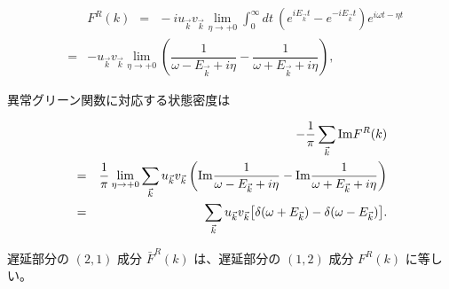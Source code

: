 \documentclass[uplatex,a4j,12pt,dvipdfmx]{jsarticle}
\begin{document}
\begin{eqnarray}
	&&
	F^{R}(k)
	\ \ = \ \
	- i
	u_{\vec{k}}
	v_{\vec{k}}
	\lim_{\eta \to +0}
	\int^{\infty}_{0} \!\! dt \
	\left(
	e^{ i E_{\vec{k}} t }
	-
	e^{ - i E_{\vec{k}} t }
	\right)
	e^{i \omega t - \eta t}
	\nonumber \\ &=&
	-
	u_{\vec{k}} v_{\vec{k}}
	\lim_{\eta \to +0}
	\left(
	\dfrac{1}{\omega - E_{\vec{k}} + i \eta }
	-
	\dfrac{1}{\omega + E_{\vec{k}} + i \eta }
	\right)
	,
\end{eqnarray}

異常グリーン関数に対応する状態密度は

\begin{eqnarray}
	&&
	-
	\dfrac{ 1 }{ \pi }
	\sum_{\vec{k}}
	{\rm Im} F^{R}(k)
	\nonumber \\ &=&
	\dfrac{ 1 }{ \pi }
	\lim_{\eta \to +0}
	\sum_{\vec{k}}
	u_{\vec{k}} v_{\vec{k}}
	\left(
	{\rm Im}
	\dfrac{1}{\omega - E_{\vec{k}} + i \eta }
	-
	{\rm Im}
	\dfrac{1}{\omega + E_{\vec{k}} + i \eta }
	\right)
	\nonumber \\ &=&
	\sum_{\vec{k}}
	u_{\vec{k}} v_{\vec{k}}
	\big[
		\delta( \omega + E_{\vec{k}} )
		-
		\delta( \omega - E_{\vec{k}} )
		\big]
	.
	\nonumber \\
\end{eqnarray}


遅延部分の $(2,1)$ 成分 $\bar{F}^{R}(k)$ は、遅延部分の $(1,2)$ 成分 $F^{R}(k)$ に等しい。
\end{document}
